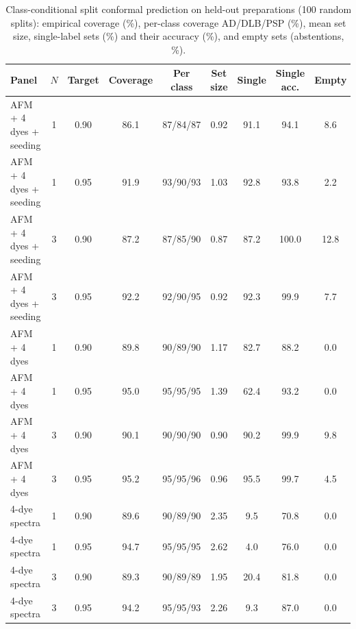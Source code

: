 \begin{table}[!htbp]
\centering\scriptsize
\caption{Class-conditional split conformal prediction on held-out preparations (100 random splits): empirical coverage (\%), per-class coverage AD/DLB/PSP (\%), mean set size, single-label sets (\%) and their accuracy (\%), and empty sets (abstentions, \%).}\label{tab:s_conformal}
\begin{tabular}{lcccccccc}
\toprule
\textbf{Panel} & \textbf{$N$} & \textbf{Target} & \textbf{Coverage} & \textbf{Per class} & \textbf{Set size} & \textbf{Single} & \textbf{Single acc.} & \textbf{Empty} \\
\midrule
AFM + 4 dyes + seeding & 1 & 0.90 & 86.1 & 87/84/87 & 0.92 & 91.1 & 94.1 & 8.6 \\
AFM + 4 dyes + seeding & 1 & 0.95 & 91.9 & 93/90/93 & 1.03 & 92.8 & 93.8 & 2.2 \\
AFM + 4 dyes + seeding & 3 & 0.90 & 87.2 & 87/85/90 & 0.87 & 87.2 & 100.0 & 12.8 \\
AFM + 4 dyes + seeding & 3 & 0.95 & 92.2 & 92/90/95 & 0.92 & 92.3 & 99.9 & 7.7 \\
AFM + 4 dyes & 1 & 0.90 & 89.8 & 90/89/90 & 1.17 & 82.7 & 88.2 & 0.0 \\
AFM + 4 dyes & 1 & 0.95 & 95.0 & 95/95/95 & 1.39 & 62.4 & 93.2 & 0.0 \\
AFM + 4 dyes & 3 & 0.90 & 90.1 & 90/90/90 & 0.90 & 90.2 & 99.9 & 9.8 \\
AFM + 4 dyes & 3 & 0.95 & 95.2 & 95/95/96 & 0.96 & 95.5 & 99.7 & 4.5 \\
4-dye spectra & 1 & 0.90 & 89.6 & 90/89/90 & 2.35 & 9.5 & 70.8 & 0.0 \\
4-dye spectra & 1 & 0.95 & 94.7 & 95/95/95 & 2.62 & 4.0 & 76.0 & 0.0 \\
4-dye spectra & 3 & 0.90 & 89.3 & 90/89/89 & 1.95 & 20.4 & 81.8 & 0.0 \\
4-dye spectra & 3 & 0.95 & 94.2 & 95/95/93 & 2.26 & 9.3 & 87.0 & 0.0 \\
\bottomrule
\end{tabular}
\end{table}

